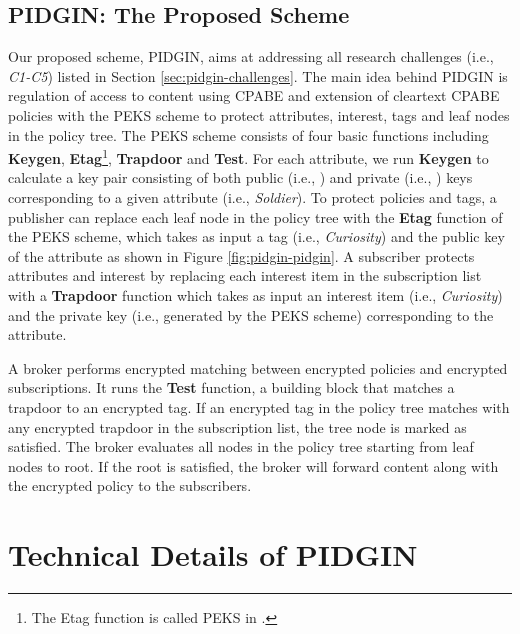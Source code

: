 \documentclass[epsfig,a4paper,11pt,titlepage]{book}
\numberwithin{algorithm}{chapter}
\begin{document}
\subsection[PIDGIN: The Proposed Scheme]{\gls{PIDGIN}: The Proposed Scheme}
Our proposed scheme, \gls{PIDGIN}, aims at addressing all research challenges (i.e., \textit{C1-C5}) listed in Section \ref{sec:pidgin-challenges}. The main idea behind \gls{PIDGIN} is regulation of access to content using \gls{CPABE} and extension of cleartext \gls{CPABE} policies with the \gls{PEKS} scheme \cite{Boneh:2004} to protect attributes, interest, tags and leaf nodes in the policy tree. The \gls{PEKS} scheme consists of four basic functions including \textbf{Keygen}, \textbf{Etag}\footnote{The Etag function is called \gls{PEKS} in \cite{Boneh:2004}.}, \textbf{Trapdoor} and \textbf{Test}. For each attribute, we run \textbf{Keygen} to calculate a key pair consisting of both public (i.e., ) and private (i.e., ) keys corresponding to a given attribute (i.e., \emph{Soldier}). To protect policies and tags, a publisher can replace each leaf node in the policy tree with the \textbf{Etag} function of the \gls{PEKS} scheme, which takes as input a tag (i.e., \emph{Curiosity}) and the public key of the attribute as shown in Figure \ref{fig:pidgin-pidgin}. A subscriber protects attributes and interest by replacing each interest item in the subscription list with a \textbf{Trapdoor} function which takes as input an interest item (i.e., \emph{Curiosity}) and the private key (i.e., generated by the \gls{PEKS} scheme) corresponding to the attribute. 

A broker performs encrypted matching between encrypted policies and encrypted subscriptions. It runs the \textbf{Test} function, a building block that matches a trapdoor to an encrypted tag. If an encrypted tag in the policy tree  matches with any encrypted trapdoor in the subscription list, the tree node is marked as satisfied. The broker evaluates all nodes in the policy tree starting from leaf nodes to root. If the root is satisfied, the broker will forward content along with the encrypted policy to the subscribers.

\section[Technical Details of PIDGIN]{Technical Details of \acrshort{PIDGIN}}
\label{sec:pidgin-details}
\end{document}
